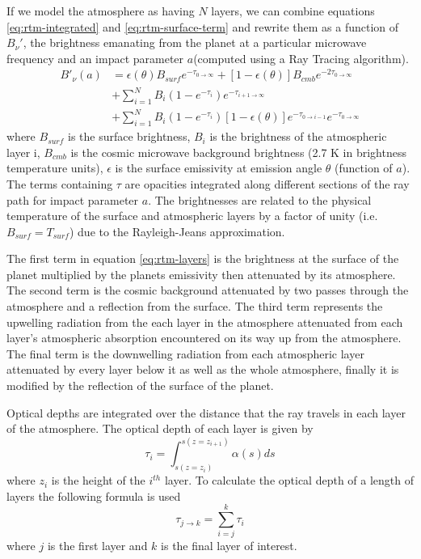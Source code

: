 If we model the atmosphere as having $N$ layers, we can combine equations \ref{eq:rtm-integrated} and \ref{eq:rtm-surface-term} and rewrite them as a function of $B_\nu'$, the brightness emanating from the planet at a particular microwave frequency and an impact parameter $a$(computed using a Ray Tracing algorithm).
\begin{equation}\label{eq:rtm-layers}
\begin{split}
B'_\nu(a) &= \epsilon(\theta)B_{surf} e^{-\tau_{0\rightarrow \infty}} + [1-\epsilon(\theta)]B_{cmb}e^{-2\tau_{0\rightarrow\infty}}\\
&+ \sum_{i=1}^N B_i(1-e^{-\tau_i}) e^{-\tau_{i+1\rightarrow \infty}} \\
&+ \sum_{i=1}^N B_i(1-e^{-\tau_i})[1-\epsilon(\theta)] e^{-\tau_{0\rightarrow i-1}} e^{-\tau_{0\rightarrow \infty}}
\end{split}
\end{equation}
where $B_{surf}$ is the surface brightness, $B_i$ is the brightness of the atmospheric layer i, $B_{cmb}$ is the cosmic microwave background brightness (2.7 K in brightness temperature units), $\epsilon$ is the surface emissivity at emission angle $\theta$ (function of $a$). The terms containing $\tau$ are opacities integrated along different sections of the ray path for impact parameter $a$. The brightnesses are related to the physical temperature of the surface and atmospheric layers by a factor of unity (i.e. $B_{surf}= T_{surf}$) due to the Rayleigh-Jeans approximation. 

The first term in equation \ref{eq:rtm-layers} is the brightness at the surface of the planet multiplied by the planets emissivity then attenuated by its atmosphere. The second term is the cosmic background attenuated by two passes through the atmosphere and a reflection from the surface. The third term represents the upwelling radiation from the each layer in the atmosphere attenuated from each layer's atmospheric absorption encountered on its way up from the atmosphere. The final term is the downwelling radiation from each atmospheric layer attenuated by every layer below it as well as the whole atmosphere, finally it is modified by the reflection of the surface of the planet. 

Optical depths are integrated over the distance that the ray travels in each layer of the atmosphere. The optical depth of each layer is given by
\begin{equation}\label{eq:rtm-layerdepth}
\tau_i = \int_{s(z=z_i)}^{s(z=z_{i+1})} \alpha(s) ds
\end{equation}
where $z_i$ is the height of the $i^{th}$ layer. To calculate the optical depth of a length of layers the following formula is used
\begin{equation}\label{eq:rtm-layersum}
\tau_{j\rightarrow k} = \sum_{i=j}^k \tau_i
\end{equation}
where $j$ is the first layer and $k$ is the final layer of interest. 

